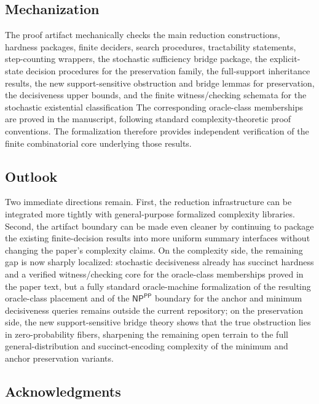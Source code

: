 \subsection*{Mechanization}

The proof artifact mechanically checks the main reduction constructions, hardness packages, finite deciders, search procedures, tractability statements, step-counting wrappers, the stochastic sufficiency bridge package, the explicit-state decision procedures for the preservation family, the full-support inheritance results, the new support-sensitive obstruction and bridge lemmas for preservation, the decisiveness upper bounds, and the finite witness/checking schemata for the stochastic existential classification  The corresponding oracle-class memberships are proved in the manuscript, following standard complexity-theoretic proof conventions. The formalization therefore provides independent verification of the finite combinatorial core underlying those results.

\subsection*{Outlook}

Two immediate directions remain. First, the reduction infrastructure can be integrated more tightly with general-purpose formalized complexity libraries. Second, the artifact boundary can be made even cleaner by continuing to package the existing finite-decision results into more uniform summary interfaces without changing the paper's complexity claims. On the complexity side, the remaining gap is now sharply localized: stochastic decisiveness already has succinct hardness and a verified witness/checking core for the oracle-class memberships proved in the paper text, but a fully standard oracle-machine formalization of the resulting oracle-class placement and of the $\textsf{NP}^{\textsf{PP}}$ boundary for the anchor and minimum decisiveness queries remains outside the current repository; on the preservation side, the new support-sensitive bridge theory shows that the true obstruction lies in zero-probability fibers, sharpening the remaining open terrain to the full general-distribution and succinct-encoding complexity of the minimum and anchor preservation variants.

\subsection*{Acknowledgments}

